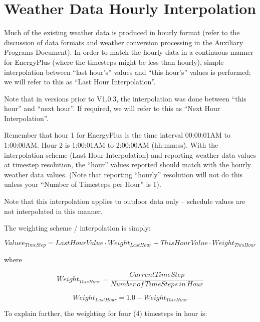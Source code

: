 \section{Weather Data Hourly Interpolation}\label{weather-data-hourly-interpolation}

Much of the existing weather data is produced in hourly format (refer to the discussion of data formats and weather conversion processing in the Auxiliary Programs Document). In order to match the hourly data in a continuous manner for EnergyPlus (where the timesteps might be less than hourly), simple interpolation between ``last hour's'' values and ``this hour's'' values is performed; we will refer to this as ``Last Hour Interpolation''.

Note that in versions prior to V1.0.3, the interpolation was done between ``this hour'' and ``next hour''. If required, we will refer to this as ``Next Hour Interpolation''.

Remember that hour 1 for EnergyPlus is the time interval 00:00:01AM to 1:00:00AM. Hour 2 is 1:00:01AM to 2:00:00AM (hh:mm:ss). With the interpolation scheme (Last Hour Interpolation) and reporting weather data values at timestep resolution, the ``hour'' values reported should match with the hourly weather data values. (Note that reporting ``hourly'' resolution will not do this unless your ``Number of Timesteps per Hour'' is 1).

Note that this interpolation applies to outdoor data only -- schedule values are not interpolated in this manner.

The weighting scheme / interpolation is simply:

\begin{equation}
Value{e_{TimeStep}} = LastHourValue\cdot Weigh{t_{LastHour}} + ThisHourValue\cdot Weigh{t_{ThisHour}}
\end{equation}

where

\begin{equation}
Weigh{t_{ThisHour}} = \frac{{CurrentTimeStep}}{{Number\,of\,TimeSteps\,in\,Hour}}
\end{equation}

\begin{equation}
Weigh{t_{LastHour}} = 1.0 - Weigh{t_{ThisHour}}
\end{equation}

To explain further, the weighting for four (4) timesteps in hour is:

